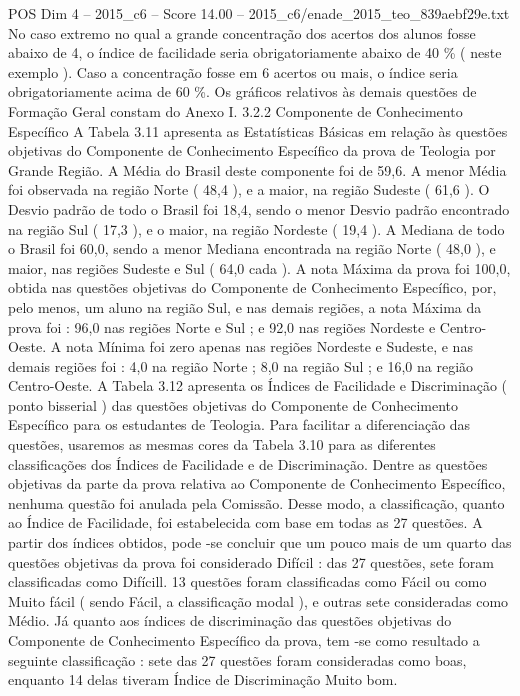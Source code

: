 \begin{textsample}{POS Dim 4 – 2015\_c6 – Score 14.00 – 2015\_c6/enade\_2015\_teo\_839aebf29e.txt}
No caso extremo no qual a grande concentração dos acertos dos alunos fosse abaixo de 4, o índice de facilidade seria obrigatoriamente abaixo de 40 \% ( neste exemplo ).
Caso a concentração fosse em 6 acertos ou mais, o índice seria obrigatoriamente acima de 60 \%.
Os gráficos relativos às demais questões de Formação Geral constam do Anexo I. 3.2.2 Componente de Conhecimento Específico A Tabela 3.11 apresenta as Estatísticas Básicas em relação às questões objetivas do Componente de Conhecimento Específico da prova de Teologia por Grande Região.
A Média do Brasil deste componente foi de 59,6.
A menor Média foi observada na região Norte ( 48,4 ), e a maior, na região Sudeste ( 61,6 ).
O Desvio padrão de todo o Brasil foi 18,4, sendo o menor Desvio padrão encontrado na região Sul ( 17,3 ), e o maior, na região Nordeste ( 19,4 ).
A Mediana de todo o Brasil foi 60,0, sendo a menor Mediana encontrada na região Norte ( 48,0 ), e maior, nas regiões Sudeste e Sul ( 64,0 cada ).
A nota Máxima da prova foi 100,0, obtida nas questões objetivas do Componente de Conhecimento Específico, por, pelo menos, um aluno na região Sul, e nas demais regiões, a nota Máxima da prova foi : 96,0 nas regiões Norte e Sul ; e 92,0 nas regiões Nordeste e Centro-Oeste.
A nota Mínima foi zero apenas nas regiões Nordeste e Sudeste, e nas demais regiões foi : 4,0 na região Norte ; 8,0 na região Sul ; e 16,0 na região Centro-Oeste.
A Tabela 3.12 apresenta os Índices de Facilidade e Discriminação ( ponto bisserial ) das questões objetivas do Componente de Conhecimento Específico para os estudantes de Teologia.
Para facilitar a diferenciação das questões, usaremos as mesmas cores da Tabela 3.10 para as diferentes classificações dos Índices de Facilidade e de Discriminação.
Dentre as questões objetivas da parte da prova relativa ao Componente de Conhecimento Específico, nenhuma questão foi anulada pela Comissão.
Desse modo, a classificação, quanto ao Índice de Facilidade, foi estabelecida com base em todas as 27 questões.
A partir dos índices obtidos, pode -se concluir que um pouco mais de um quarto das questões objetivas da prova foi considerado Difícil : das 27 questões, sete foram classificadas como Difícill. 13 questões foram classificadas como Fácil ou como Muito fácil ( sendo Fácil, a classificação modal ), e outras sete consideradas como Médio.
Já quanto aos índices de discriminação das questões objetivas do Componente de Conhecimento Específico da prova, tem -se como resultado a seguinte classificação : sete das 27 questões foram consideradas como boas, enquanto 14 delas tiveram Índice de Discriminação Muito bom.

\end{textsample}
